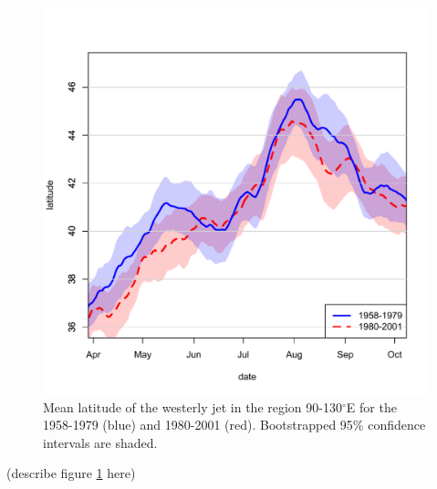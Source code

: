 \documentclass[draft,grl]{AGUTeX}
\begin{document}
\begin{article}
\begin{figure}[htbp]
\begin{center}
\includegraphics[width=5in]{Figures/jet_seasonal.pdf}
\caption{Mean latitude of the westerly jet in the region 90-130$^\circ$E for the 1958-1979 (blue) and 1980-2001 (red). Bootstrapped 95\% confidence intervals are shaded. }
\label{jet_seasonal}
\end{center}
\end{figure}

(describe figure \ref{jet_seasonal} here) 

	






\end{article}
\end{document}
